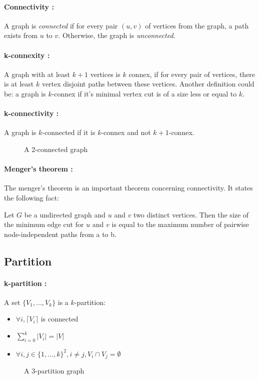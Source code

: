 \paragraph{Connectivity :}\label{defConnectivity}
A graph is {\em connected} if for every pair $(u,v)$ of vertices from the
graph, a path exists from $u$ to $v$. Otherwise, the graph is {\em unconnected}.

\paragraph{k-connexity :}
A graph with at least $k+1$ vertices is $k$ connex, if for every pair of
vertices, there is at least $k$ vertex disjoint paths between these vertices.
Another definition could be: a graph is $k$-connex if it's minimal vertex cut
is of a size less or equal to $k$.

\paragraph{k-connectivity :}
A graph is $k$-connected if it is $k$-connex and not $k+1$-connex. 

\begin{figure}[!h]
  \begin{center}
    
  \end{center}
  \caption{A 2-connected graph}
\end{figure}

\paragraph{Menger's theorem :}
The menger's theorem is an important theorem concerning connectivity.
It states the following fact:

Let $G$ be a undirected graph and $u$ and $v$ two distinct vertices.
Then the size of the minimum edge cut for $u$ and $v$ is equal to the maximum
number of pairwise node-independent paths from a to b.


\subsection{Partition}
\paragraph{k-partition :}
A set $\{V_1,...,V_k\}$ is a $k$-partition:
\begin{itemize}
    \item $\forall i, \lceil V_i \rceil$ is connected
    \item $\sum\limits_{i=0}^k|V_i| = |V|$
    \item $\forall i,j \in \{1, \dots, k\}^2, i \neq j, V_i \cap V_j = \emptyset$
\end{itemize}

\begin{figure}[!h]
    \begin{center}
        
    \end{center}
    \caption{A 3-partition graph}
\end{figure}

